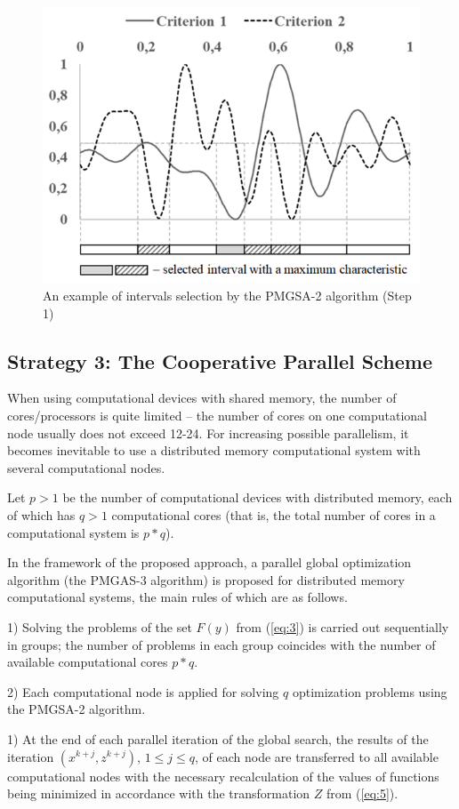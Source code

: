 \documentclass[review]{elsarticle}
\begin{document}
\begin{figure}
  \centering
  \includegraphics[width=0.7\linewidth]{fig3}
  \caption{An example of intervals selection by the PMGSA-2 algorithm (Step 1)}
  \label{fig:3}
\end{figure}

\subsection{Strategy 3: The Cooperative Parallel Scheme} \label{subsec:3}

When using computational devices with shared memory, the number of {cores/processors} is quite limited -- the number of cores on one computational node usually does not exceed 12-24. For increasing possible parallelism, it becomes inevitable to use a distributed memory computational system with several computational nodes.

Let $p>1$ be the number of computational devices with distributed memory, each of which has $q>1$ computational cores (that is, the total number of cores in a computational system is $p*q$). 

In the framework of the proposed approach, a parallel global optimization algorithm (the PMGAS-3 algorithm) is proposed for distributed memory computational systems, the main rules of which are as follows.


1) Solving the problems of the set $F(y)$ from (\ref{eq:3}) is carried out sequentially in groups; the number of problems in each group coincides with the number of available computational cores $p*q$.

2) Each computational node is applied for solving $q$ optimization problems using the PMGSA-2 algorithm.

1) At the end of each parallel iteration of the global search, the results of the iteration $(x^{k+j},z^{k+j} )$, $1 \leq j \leq q$, of each node are transferred to all available computational nodes with the necessary recalculation of the values of functions being minimized in accordance with the transformation $Z$ from (\ref{eq:5}).
\end{document}
